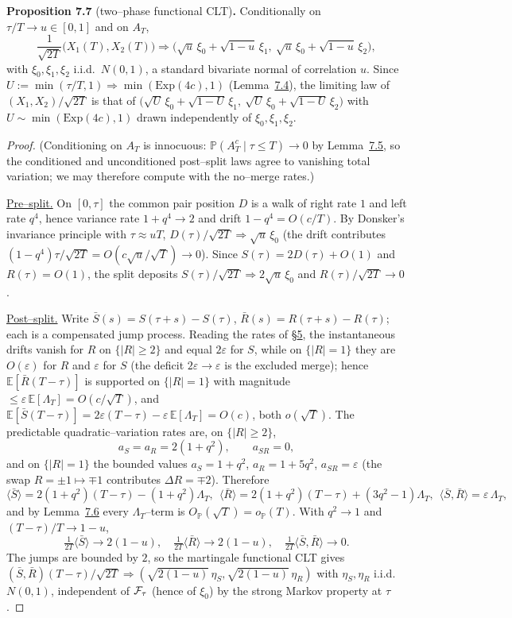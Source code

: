 \documentclass[11pt]{article}
\theoremstyle{plain}
\theoremstyle{definition}
\theoremstyle{remark}
\newcommand{\E}{\mathbb{E}}\newcommand{\PP}{\mathbb{P}}\newcommand{\dd}{\,\mathrm{d}}
\newcommand{\To}{\Rightarrow}\newcommand{\so}{\mathfrak{so}}
\newcommand{\eps}{\varepsilon}\newcommand{\Exp}{\mathrm{Exp}}
\begin{document}
\label{prop_twophase}\noindent\textbf{Proposition 7.7} (two--phase functional CLT)\textbf{.} 
Conditionally on $\tau/T\to u\in[0,1]$ and on $A_T$,
\[
  \frac1{\sqrt{2T}}\big(X_1(T),X_2(T)\big)\To
  \big(\sqrt u\,\xi_0+\sqrt{1-u}\,\xi_1,\ \sqrt u\,\xi_0+\sqrt{1-u}\,\xi_2\big),
\]
with $\xi_0,\xi_1,\xi_2$ i.i.d.\ $N(0,1)$, a standard bivariate normal of correlation $u$.
Since $U:=\min(\tau/T,1)\To\min(\Exp(4c),1)$ (Lemma~\hyperref[lem_split]{7.4}), the limiting law of
$(X_1,X_2)/\sqrt{2T}$ is that of
$\big(\sqrt U\,\xi_0+\sqrt{1-U}\,\xi_1,\ \sqrt U\,\xi_0+\sqrt{1-U}\,\xi_2\big)$ with
$U\sim\min(\Exp(4c),1)$ drawn independently of $\xi_0,\xi_1,\xi_2$.
\par
\begin{proof}
(Conditioning on $A_T$ is innocuous: $\PP(A_T^c\mid\tau\le T)\to0$ by
Lemma~\hyperref[lem_rebind]{7.5}, so the conditioned and unconditioned post--split laws agree
to vanishing total variation; we may therefore compute with the no--merge rates.)

\underline{Pre--split.} On $[0,\tau]$ the common pair position $D$ is a walk of right rate
$1$ and left rate $q^4$, hence variance rate $1+q^4\to2$ and drift $1-q^4=O(c/T)$. By
Donsker's invariance principle with $\tau\approx uT$, $D(\tau)/\sqrt{2T}\To\sqrt u\,\xi_0$
(the drift contributes $(1-q^4)\tau/\sqrt{2T}=O(c\sqrt u/\sqrt T)\to0$). Since
$S(\tau)=2D(\tau)+O(1)$ and $R(\tau)=O(1)$, the split deposits
$S(\tau)/\sqrt{2T}\To2\sqrt u\,\xi_0$ and $R(\tau)/\sqrt{2T}\to0$.

\underline{Post--split.} Write $\bar S(s)=S(\tau{+}s)-S(\tau)$, $\bar R(s)=R(\tau{+}s)-R(\tau)$;
each is a compensated jump process. Reading the rates of \S\hyperref[sec_kernel]{5}, the
instantaneous drifts vanish for $R$ on $\{|R|\ge2\}$ and equal $2\eps$ for $S$, while on
$\{|R|=1\}$ they are $O(\eps)$ for $R$ and $\eps$ for $S$ (the deficit $2\eps\to\eps$ is
the excluded merge); hence $\E[\bar R(T{-}\tau)]$ is supported on $\{|R|=1\}$ with
magnitude $\le\eps\,\E[\Lambda_T]=O(c/\sqrt T)$, and
$\E[\bar S(T{-}\tau)]=2\eps(T{-}\tau)-\eps\,\E[\Lambda_T]=O(c)$, both $o(\sqrt T)$. The
predictable quadratic--variation rates are, on $\{|R|\ge2\}$,
\[
  a_S=a_R=2(1+q^2),\qquad a_{SR}=0,
\]
and on $\{|R|=1\}$ the bounded values $a_S=1+q^2$, $a_R=1+5q^2$, $a_{SR}=\eps$ (the swap
$R=\pm1\mapsto\mp1$ contributes $\Delta R=\mp2$). Therefore
\[
  \langle\bar S\rangle=2(1+q^2)(T{-}\tau)-(1+q^2)\Lambda_T,\ \
  \langle\bar R\rangle=2(1+q^2)(T{-}\tau)+(3q^2{-}1)\Lambda_T,\ \
  \langle\bar S,\bar R\rangle=\eps\,\Lambda_T,
\]
and by Lemma~\hyperref[lem_occ]{7.6} every $\Lambda_T$--term is $O_\PP(\sqrt T)=o_\PP(T)$. With
$q^2\to1$ and $(T{-}\tau)/T\to1-u$,
\[
  \tfrac1{2T}\langle\bar S\rangle\to2(1-u),\quad
  \tfrac1{2T}\langle\bar R\rangle\to2(1-u),\quad
  \tfrac1{2T}\langle\bar S,\bar R\rangle\to0.
\]
The jumps are bounded by $2$, so the martingale functional CLT
\cite[Thm.~7.1.4]{EK} gives $(\bar S,\bar R)(T{-}\tau)/\sqrt{2T}\To
(\sqrt{2(1-u)}\,\eta_S,\sqrt{2(1-u)}\,\eta_R)$ with $\eta_S,\eta_R$ i.i.d.\ $N(0,1)$,
independent of $\mathcal F_\tau$ (hence of $\xi_0$) by the strong Markov property at $\tau$.


\end{proof}
\end{document}

